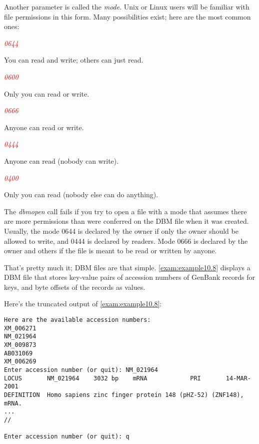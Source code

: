 Another parameter is called the \textit{mode}. Unix or Linux users will be familiar with file permissions in this form. Many possibilities exist; here are the most common ones:

\textcolor{red}{\textit{0644}}
\begin{adjustwidth}{2em}{}
You can read and write; others can just read.
\end{adjustwidth}

\textcolor{red}{\textit{0600}}
\begin{adjustwidth}{2em}{}
Only you can read or write.
\end{adjustwidth}

\textcolor{red}{\textit{0666}}
\begin{adjustwidth}{2em}{}
Anyone can read or write.
\end{adjustwidth}

\textcolor{red}{\textit{0444}}
\begin{adjustwidth}{2em}{}
Anyone can read (nobody can write).
\end{adjustwidth}

\textcolor{red}{\textit{0400}}
\begin{adjustwidth}{2em}{}
Only you can read (nobody else can do anything).
\end{adjustwidth}

The \textit{dbmopen} call fails if you try to open a file with a mode that assumes there are more permissions than were conferred on the DBM file when it was created. Usually, the mode 0644 is declared by the owner if only the owner should be allowed to write, and 0444 is declared by readers. Mode 0666 is declared by the owner and others if the file is meant to be read or written by anyone.

That's pretty much it; DBM files are that simple. \autoref{exam:example10.8} displays a DBM file that stores key-value pairs of accession numbers of GenBank records for keys, and byte offsets of the records as values.



Here's the truncated output of \autoref{exam:example10.8}:

\begin{lstlisting}
Here are the available accession numbers:
XM_006271
NM_021964
XM_009873
AB031069
XM_006269
Enter accession number (or quit): NM_021964
LOCUS       NM_021964    3032 bp    mRNA            PRI       14-MAR-2001
DEFINITION  Homo sapiens zinc finger protein 148 (pHZ-52) (ZNF148), mRNA.
...
//

Enter accession number (or quit): q
\end{lstlisting}


